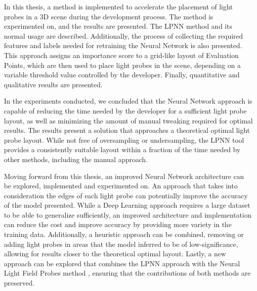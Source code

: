 In this thesis, a method is implemented to accelerate the placement of light probes in a 3D scene during the development process. The method is experimented on, and the results are presented. The LPNN method and its normal usage are described. Additionally, the process of collecting the required features and labels needed for retraining the Neural Network is also presented. This approach assigns an importance score to a grid-like layout of Evaluation Points, which are then used to place light probes in the scene, depending on a variable threshold value controlled by the developer. Finally, quantitative and qualitative results are presented. 

In the experiments conducted, we concluded that the Neural Network approach is capable of reducing the time needed by the developer for a sufficient light probe layout, as well as minimizing the amount of manual tweaking required for optimal results. The results present a solution that approaches a theoretical optimal light probe layout. While not free of oversampling or undersampling, the LPNN tool provides a consistently suitable layout within a fraction of the time needed by other methods, including the manual approach.

Moving forward from this thesis, an improved Neural Network architecture can be explored, implemented and experimented on. An approach that takes into consideration the edges of each light probe can potentially improve the accuracy of the model presented. While a Deep Learning approach requires a large dataset to be able to generalize sufficiently, an improved architecture and implementation can reduce the cost and improve accuracy by providing more variety in the training data. Additionally, a heuristic approach can be combined, removing or adding light probes in areas that the model inferred to be of low-significance, allowing for results closer to the theoretical optimal layout. Lastly, a new approach can be explored that combines the LPNN approach with the Neural Light Field Probes method \parencite{You2024}, ensuring that the contributions of both methods are preserved.
